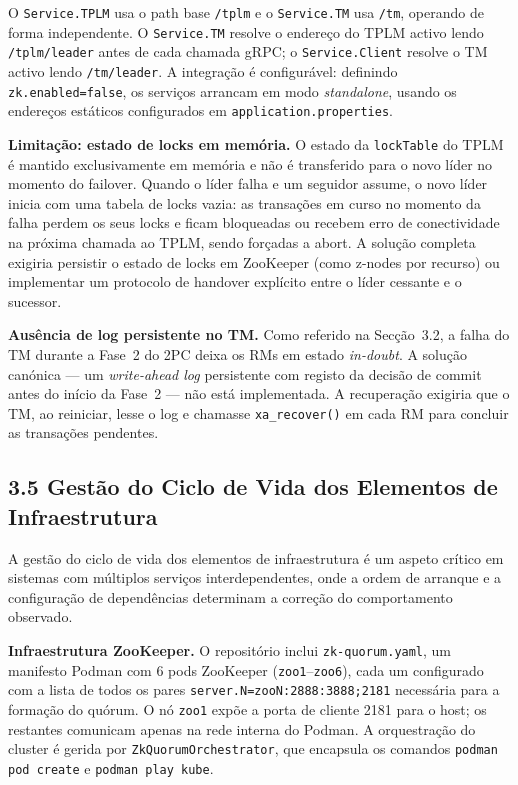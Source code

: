 O \texttt{Service.TPLM} usa o path base \texttt{/tplm} e o \texttt{Service.TM} usa
\texttt{/tm}, operando de forma independente. O \texttt{Service.TM} resolve o endereço do
TPLM activo lendo \texttt{/tplm/leader} antes de cada chamada gRPC; o
\texttt{Service.Client} resolve o TM activo lendo \texttt{/tm/leader}. A integração é
configurável: definindo \texttt{zk.enabled=false}, os serviços arrancam em modo
\textit{standalone}, usando os endereços estáticos configurados em
\texttt{application.properties}.

\textbf{Limitação: estado de locks em memória.}
O estado da \texttt{lockTable} do TPLM é mantido exclusivamente em memória e não é
transferido para o novo líder no momento do failover. Quando o líder falha e um seguidor
assume, o novo líder inicia com uma tabela de locks vazia: as transações em curso no
momento da falha perdem os seus locks e ficam bloqueadas ou recebem erro de conectividade
na próxima chamada ao TPLM, sendo forçadas a abort. A solução completa exigiria persistir
o estado de locks em ZooKeeper (como z-nodes por recurso) ou implementar um protocolo
de handover explícito entre o líder cessante e o sucessor.

\textbf{Ausência de log persistente no TM.}
Como referido na Secção~3.2, a falha do TM durante a Fase~2 do 2PC deixa os RMs em estado
\textit{in-doubt}. A solução canónica --- um \textit{write-ahead log} persistente com registo
da decisão de commit antes do início da Fase~2 --- não está implementada. A recuperação exigiria
que o TM, ao reiniciar, lesse o log e chamasse \texttt{xa\_recover()} em cada RM para concluir
as transações pendentes.

\subsection*{3.5 Gestão do Ciclo de Vida dos Elementos de Infraestrutura}

A gestão do ciclo de vida dos elementos de infraestrutura é um aspeto crítico em sistemas com
múltiplos serviços interdependentes, onde a ordem de arranque e a configuração de dependências
determinam a correção do comportamento observado.

\textbf{Infraestrutura ZooKeeper.}
O repositório inclui \texttt{zk-quorum.yaml}, um manifesto Podman com 6 pods ZooKeeper
(\texttt{zoo1}--\texttt{zoo6}), cada um configurado com a lista de todos os pares
\texttt{server.N=zooN:2888:3888;2181} necessária para a formação do quórum. O nó
\texttt{zoo1} expõe a porta de cliente 2181 para o host; os restantes comunicam apenas
na rede interna do Podman. A orquestração do cluster é gerida por
\texttt{ZkQuorumOrchestrator}, que encapsula os comandos \texttt{podman pod create}
e \texttt{podman play kube}.

